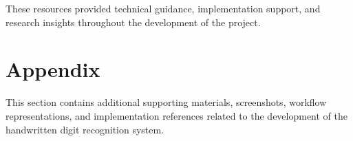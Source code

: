 \documentclass[12pt,a4paper]{article}
\begin{document}
\noindent
These resources provided technical guidance, implementation support, and research insights throughout the development of the project.

\newpage

\section{Appendix}

\vspace{0.3cm}

\noindent
This section contains additional supporting materials, screenshots, workflow representations, and implementation references related to the development of the handwritten digit recognition system.

\vspace{0.4cm}
\end{document}
